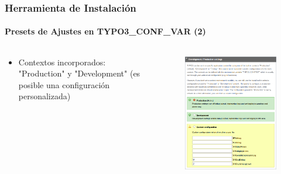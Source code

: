 
\begin{frame}[fragile]
	\frametitle{Herramienta de Instalación}
	\framesubtitle{Presets de Ajustes en TYPO3\_CONF\_VAR (2)}

	\begin{columns}[T]
		\begin{column}{.5\textwidth}

			\begin{itemize}
				\item Contextos incorporados: "Production" y "Development"\newline
					(es posible una configuración personalizada)
			\end{itemize}

		\end{column}
		\begin{column}{.5\textwidth}

			\begin{figure}\vspace*{-0.4cm}
				\includegraphics[width=0.8\linewidth]{Images/InstallTool/ApplicationContext.png}
			\end{figure}

		\end{column}
	\end{columns}

\end{frame}

